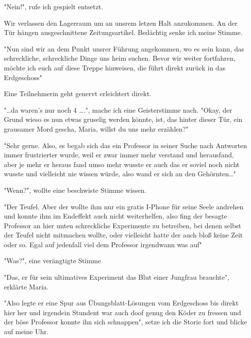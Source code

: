 \documentclass[11pt]{article}
\begin{document}
\begin{center}
"Nein!", rufe ich gespielt entsetzt.
\end{center}
Wir verlassen den Lagerraum um an unsrem letzen Halt anzukommen. An
der Tür hängen ausgeschnittene Zeitungsartikel. Bedächtig senke ich
meine Stimme.
\begin{center}
"Nun sind wir an dem Punkt unsrer Führung angekommen, wo es sein kann,
das schreckliche, schreckliche Dinge uns heim suchen. Bevor wir weiter
fortfahren, möchte ich euch auf diese Treppe hinweisen, die führt
direkt zurück in das Erdgeschoss"
\end{center}
Eine Teilnehmerin geht genervt erleichtert direkt.
\begin{center}
"\ldots{}da waren's nur noch 4 \ldots{}.", mache ich eine Geisterstimme nach.
"Okay, der Grund wieso es nun etwas gruselig werden könnte, ist, das
hinter dieser Tür, ein grausamer Mord gescha, Maria, willst du uns
mehr erzählen?"
\end{center}
\begin{center}
"Sehr gerne. Also, es begab sich das ein Professor in seiner Suche
nach Antworten immer frustrierter wurde, weil er zwar immer mehr
verstand und herausfand, aber je mehr er heraus fand umso mehr wusste
er auch das er soviel noch nicht wusste und vielleicht nie wissen
würde, also wand er sich an den Gehörnten\ldots{}"
\end{center}
\begin{center}
"Wenn?", wollte eine beschwiste Stimme wissen.
\end{center}
\begin{center}
"Der Teufel. Aber der wollte ihm nur ein gratis I-Phone für seine
Seele andrehen und konnte ihm im Endeffekt auch nicht weiterhelfen,
also fing der besagte Professor an hier unten schreckliche Experimente
zu betreiben, bei denen selbst der Teufel nicht mitmachen wollte, oder
vielleicht hatte der auch bloß keine Zeit oder so. Egal auf jedenfall
viel dem Professor irgendwann was auf"
\end{center}
\begin{center}
"Was?", eine verängtigte Stimme
\end{center}
\begin{center}
"Das, er für sein ultimatives Experiment das Blut einer Jungfrau
brauchte", erklärte Maria.
\end{center}
\begin{center}
"Also legte er eine Spur aus Übungsblatt-Lösungen vom Erdgeschoss
bis direkt hier her und irgendein Stundent war auch doof genug den
Köder zu fressen und der böse Professor konnte ihn sich schnappen",
setze ich die Storie fort und blicke auf meine Uhr.
\end{center}
\end{document}
